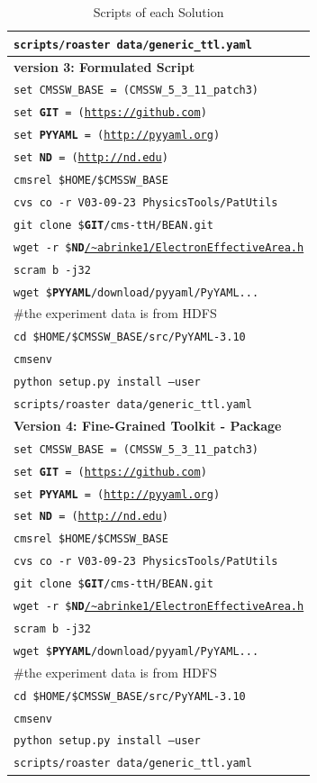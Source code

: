 \documentclass{acm_proc_article-sp}
\begin{document}
\begin{table}
\begin{tabular}{|l|}
        {\tt scripts/roaster data/generic\_ttl.yaml} \\ 
        \hline
        {\bf version 3: Formulated Script} \\ \hline
        {\tt set CMSSW\_BASE = (CMSSW\_5\_3\_11\_patch3)} \\
        {\tt set {\bf GIT} = (\url{https://github.com})} \\
        {\tt set {\bf PYYAML} = (\url{http://pyyaml.org})} \\
        {\tt set {\bf ND} = (\url{http://nd.edu})} \\
        {\tt cmsrel \$HOME/\$CMSSW\_BASE} \\
        {\tt cvs co -r V03-09-23 PhysicsTools/PatUtils} \\
        {\tt git clone \${\bf GIT}/cms-ttH/BEAN.git} \\
        {\tt wget -r \${\bf ND}\url{/~abrinke1/ElectronEffectiveArea.h}} \\
        {\tt scram b -j32} \\
        {\tt wget \${\bf PYYAML}/download/pyyaml/PyYAML...}\\
        \#the experiment data is from HDFS \\
        {\tt cd \$HOME/\$CMSSW\_BASE/src/PyYAML-3.10}\\
        {\tt cmsenv}\\
        {\tt python setup.py install --user} \\
        {\tt scripts/roaster data/generic\_ttl.yaml} \\ 
        \hline
       {\bf Version 4: Fine-Grained Toolkit - Package}\\ \hline
        {\tt set CMSSW\_BASE = (CMSSW\_5\_3\_11\_patch3)} \\
        {\tt set {\bf GIT} = (\url{https://github.com})} \\
        {\tt set {\bf PYYAML} = (\url{http://pyyaml.org})} \\
        {\tt set {\bf ND} = (\url{http://nd.edu})} \\
        {\tt cmsrel \$HOME/\$CMSSW\_BASE} \\
        {\tt cvs co -r V03-09-23 PhysicsTools/PatUtils} \\
        {\tt git clone \${\bf GIT}/cms-ttH/BEAN.git} \\
        {\tt wget -r \${\bf ND}\url{/~abrinke1/ElectronEffectiveArea.h}} \\
        {\tt scram b -j32} \\
        {\tt wget \${\bf PYYAML}/download/pyyaml/PyYAML...}\\
        \#the experiment data is from HDFS \\
        {\tt cd \$HOME/\$CMSSW\_BASE/src/PyYAML-3.10}\\
        {\tt cmsenv}\\
        {\tt python setup.py install --user} \\
        {\tt scripts/roaster data/generic\_ttl.yaml} \\ 
        \hline
    \end{tabular}
    \caption{Scripts of each Solution}
    \label{table:scripts}
\end{table}
\end{document}
